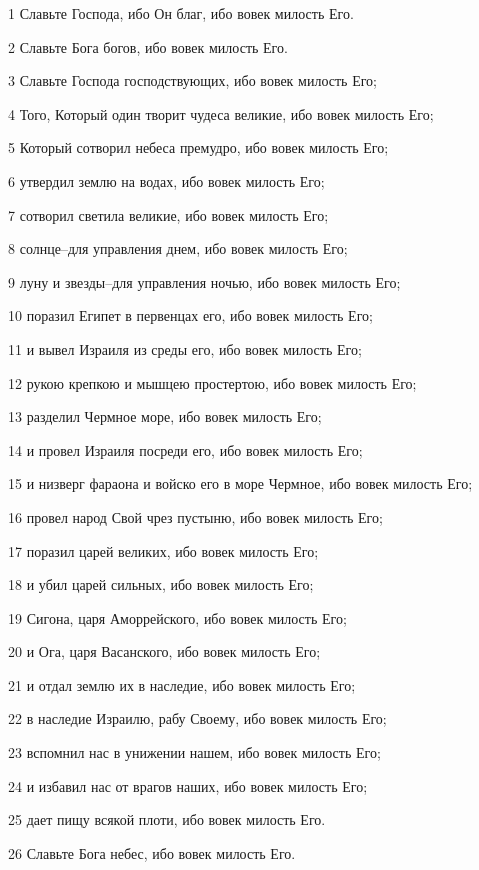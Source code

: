 \par 1 Славьте Господа, ибо Он благ, ибо вовек милость Его.
\par 2 Славьте Бога богов, ибо вовек милость Его.
\par 3 Славьте Господа господствующих, ибо вовек милость Его;
\par 4 Того, Который один творит чудеса великие, ибо вовек милость Его;
\par 5 Который сотворил небеса премудро, ибо вовек милость Его;
\par 6 утвердил землю на водах, ибо вовек милость Его;
\par 7 сотворил светила великие, ибо вовек милость Его;
\par 8 солнце--для управления днем, ибо вовек милость Его;
\par 9 луну и звезды--для управления ночью, ибо вовек милость Его;
\par 10 поразил Египет в первенцах его, ибо вовек милость Его;
\par 11 и вывел Израиля из среды его, ибо вовек милость Его;
\par 12 рукою крепкою и мышцею простертою, ибо вовек милость Его;
\par 13 разделил Чермное море, ибо вовек милость Его;
\par 14 и провел Израиля посреди его, ибо вовек милость Его;
\par 15 и низверг фараона и войско его в море Чермное, ибо вовек милость Его;
\par 16 провел народ Свой чрез пустыню, ибо вовек милость Его;
\par 17 поразил царей великих, ибо вовек милость Его;
\par 18 и убил царей сильных, ибо вовек милость Его;
\par 19 Сигона, царя Аморрейского, ибо вовек милость Его;
\par 20 и Ога, царя Васанского, ибо вовек милость Его;
\par 21 и отдал землю их в наследие, ибо вовек милость Его;
\par 22 в наследие Израилю, рабу Своему, ибо вовек милость Его;
\par 23 вспомнил нас в унижении нашем, ибо вовек милость Его;
\par 24 и избавил нас от врагов наших, ибо вовек милость Его;
\par 25 дает пищу всякой плоти, ибо вовек милость Его.
\par 26 Славьте Бога небес, ибо вовек милость Его.

